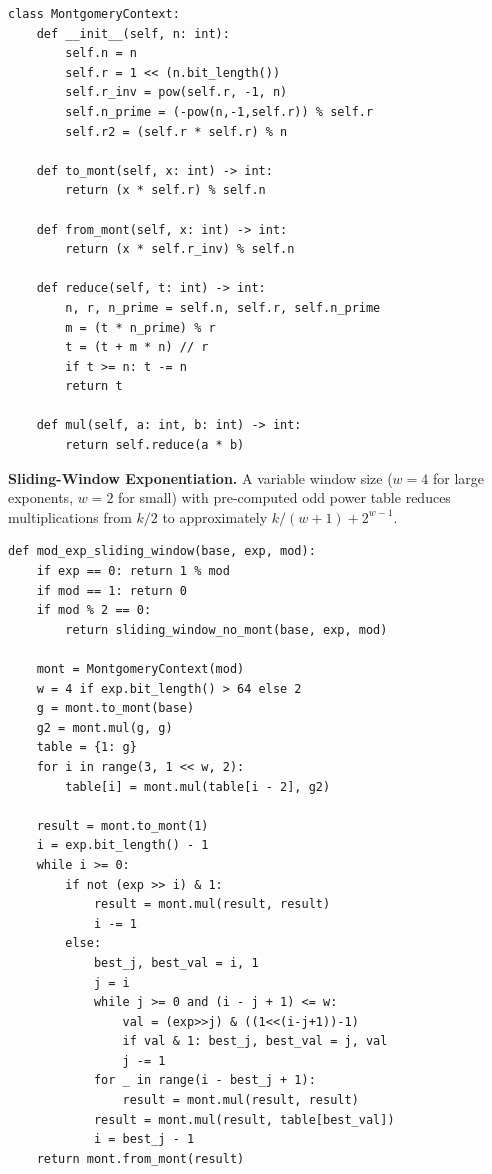 \documentclass[journal]{IEEEtran}
\begin{document}
\begin{lstlisting}
class MontgomeryContext:
    def __init__(self, n: int):
        self.n = n
        self.r = 1 << (n.bit_length())
        self.r_inv = pow(self.r, -1, n)
        self.n_prime = (-pow(n,-1,self.r)) % self.r
        self.r2 = (self.r * self.r) % n

    def to_mont(self, x: int) -> int:
        return (x * self.r) % self.n

    def from_mont(self, x: int) -> int:
        return (x * self.r_inv) % self.n

    def reduce(self, t: int) -> int:
        n, r, n_prime = self.n, self.r, self.n_prime
        m = (t * n_prime) % r
        t = (t + m * n) // r
        if t >= n: t -= n
        return t

    def mul(self, a: int, b: int) -> int:
        return self.reduce(a * b)
\end{lstlisting}
\vspace{-2mm}
\label{lst:montgomery}

\textbf{Sliding-Window Exponentiation.}
A variable window size ($w=4$ for large exponents, $w=2$ for small) with pre-computed odd power table reduces multiplications from $k/2$ to approximately $k/(w+1) + 2^{w-1}$.

\begin{lstlisting}
def mod_exp_sliding_window(base, exp, mod):
    if exp == 0: return 1 % mod
    if mod == 1: return 0
    if mod % 2 == 0:
        return sliding_window_no_mont(base, exp, mod)

    mont = MontgomeryContext(mod)
    w = 4 if exp.bit_length() > 64 else 2
    g = mont.to_mont(base)
    g2 = mont.mul(g, g)
    table = {1: g}
    for i in range(3, 1 << w, 2):
        table[i] = mont.mul(table[i - 2], g2)

    result = mont.to_mont(1)
    i = exp.bit_length() - 1
    while i >= 0:
        if not (exp >> i) & 1:
            result = mont.mul(result, result)
            i -= 1
        else:
            best_j, best_val = i, 1
            j = i
            while j >= 0 and (i - j + 1) <= w:
                val = (exp>>j) & ((1<<(i-j+1))-1)
                if val & 1: best_j, best_val = j, val
                j -= 1
            for _ in range(i - best_j + 1):
                result = mont.mul(result, result)
            result = mont.mul(result, table[best_val])
            i = best_j - 1
    return mont.from_mont(result)
\end{lstlisting}
\vspace{-2mm}
\label{lst:sliding}
\end{document}
